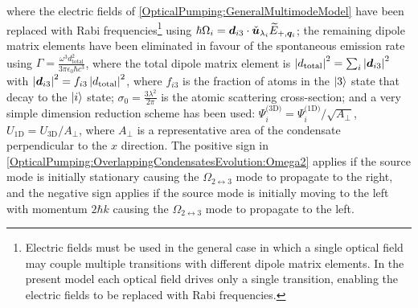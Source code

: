 where the electric fields of \eqref{OpticalPumping:GeneralMultimodeModel} have been replaced with Rabi frequencies\footnote{Electric fields must be used in the general case in which a single optical field may couple multiple transitions with different dipole matrix elements.  In the present model each optical field drives only a single transition, enabling the electric fields to be replaced with Rabi frequencies.} using $\hbar \Omega_i = \bm{d}_{i 3} \cdot \check{\bm{u}}_{\lambda_i} \widetilde{E}_{+, \bm{q}_i}$; the remaining dipole matrix elements have been eliminated in favour of the spontaneous emission rate using $\displaystyle \Gamma = \frac{\omega^3 d_\text{total}^2}{3 \pi \epsilon_0 \hbar c^3}$, where the total dipole matrix element is $\left|d_\text{total}\right|^2 = \sum_{i} \left|\bm{d}_{i3}\right|^2$ with $\left|\bm{d}_{i3}\right|^2 = f_{i3} \left|d_\text{total}\right|^2$, where $f_{i3}$ is the fraction of atoms in the ${\left|3\right>}$ state that decay to the ${\left|i\right>}$ state; $\displaystyle\sigma_0 = \frac{3 \lambda^2}{2 \pi}$ is the atomic scattering cross-section; and a very simple dimension reduction scheme has been used: $\Psi_i^\text{(3D)} = \Psi_i^\text{(1D)} / \sqrt{A_\perp}$, $U_\text{1D} = U_\text{3D} / A_\perp$, where $A_\perp$ is a representative area of the condensate perpendicular to the $x$ direction.  The positive sign in \eqref{OpticalPumping:OverlappingCondensatesEvolution:Omega2} applies if the source mode is initially stationary causing the $\Omega_{2\leftrightarrow 3}$ mode to propagate to the right, and the negative sign applies if the source mode is initially moving to the left with momentum $2 \hbar k$ causing the $\Omega_{2\leftrightarrow 3}$ mode to propagate to the left.


